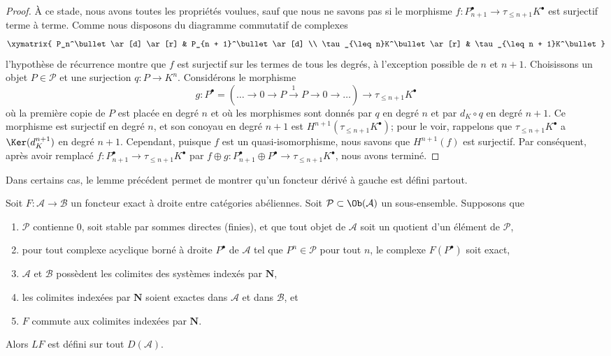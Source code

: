 \begin{proof}
\medskip\noindent
À ce stade, nous avons toutes les propriétés voulues, sauf que nous ne savons
pas si le morphisme
$f : P_{n + 1}^\bullet \to \tau_{\leq n + 1}K^\bullet$ est surjectif terme à
terme. Comme nous disposons du diagramme commutatif de complexes
$$
\xymatrix{
P_n^\bullet \ar[d] \ar[r] & P_{n + 1}^\bullet \ar[d] \\
\tau_{\leq n}K^\bullet \ar[r] & \tau_{\leq n + 1}K^\bullet
}
$$
l'hypothèse de récurrence montre que $f$ est surjectif sur les termes de tous
les degrés, à l'exception possible de $n$ et $n + 1$. Choisissons un objet
$P \in \mathcal{P}$ et une surjection $q : P \to K^n$.
Considérons le morphisme
$$
g :
P^\bullet = (\ldots \to 0 \to P \xrightarrow{1} P \to 0 \to \ldots)
\longrightarrow
\tau_{\leq n + 1}K^\bullet
$$
où la première copie de $P$ est placée en degré $n$ et où les morphismes sont
donnés par $q$ en degré $n$ et par $d_K \circ q$ en degré $n + 1$.
Ce morphisme est surjectif en degré $n$, et son conoyau en degré $n + 1$ est
$H^{n + 1}(\tau_{\leq n + 1}K^\bullet)$; pour le voir, rappelons que
$\tau_{\leq n + 1}K^\bullet$ a $\Ker(d_K^{n + 1})$ en degré $n + 1$.
Cependant, puisque $f$ est un quasi-isomorphisme, nous savons que
$H^{n + 1}(f)$ est surjectif. Par conséquent, après avoir remplacé
$f : P_{n + 1}^\bullet \to \tau_{\leq n + 1}K^\bullet$ par
$f \oplus g : P_{n + 1}^\bullet \oplus P^\bullet \to \tau_{\leq n + 1}K^\bullet$,
nous avons terminé.
\end{proof}

\noindent
Dans certains cas, le lemme précédent permet de montrer qu'un foncteur dérivé
à gauche est défini partout.

\begin{proposition}
\label{proposition-left-derived-exists}
Soit $F : \mathcal{A} \to \mathcal{B}$ un foncteur exact à droite entre
catégories abéliennes. Soit $\mathcal{P} \subset \Ob(\mathcal{A})$ un
sous-ensemble. Supposons que
\begin{enumerate}
\item $\mathcal{P}$ contienne $0$, soit stable par sommes directes (finies),
et que tout objet de $\mathcal{A}$ soit un quotient d'un élément de
$\mathcal{P}$,
\item pour tout complexe acyclique borné à droite $P^\bullet$ de
$\mathcal{A}$ tel que $P^n \in \mathcal{P}$ pour tout $n$, le complexe
$F(P^\bullet)$ soit exact,
\item $\mathcal{A}$ et $\mathcal{B}$ possèdent les colimites des systèmes
indexés par $\mathbf{N}$,
\item les colimites indexées par $\mathbf{N}$ soient exactes dans
$\mathcal{A}$ et dans $\mathcal{B}$, et
\item $F$ commute aux colimites indexées par $\mathbf{N}$.
\end{enumerate}
Alors $LF$ est défini sur tout $D(\mathcal{A})$.
\end{proposition}


